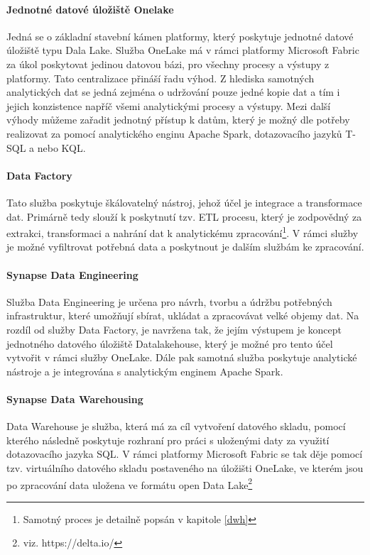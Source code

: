 \documentclass[
  digital,     %
  twoside,     %
  lof,         %
  lot,         %
]{fithesis4}
\begin{document}
\paragraph{Jednotné datové úložiště Onelake}
Jedná se o základní stavební kámen platformy, který poskytuje jednotné datové úložiště typu Dala Lake. Služba OneLake má v rámci platformy Microsoft Fabric za úkol poskytovat jedinou datovou bázi, pro všechny procesy a výstupy z platformy. Tato centralizace přináší řadu výhod. Z hlediska samotných analytických dat se jedná zejména o udržování pouze jedné kopie dat a tím i jejich konzistence napříč všemi analytickými procesy a výstupy. Mezi další výhody můžeme zařadit  jednotný přístup k datům, který je možný dle potřeby realizovat za pomocí analytického enginu Apache Spark, dotazovacího jazyků T-SQL a nebo KQL.\parencite{OneLake}

\paragraph{Data Factory}
Tato služba poskytuje škálovatelný nástroj, jehož účel je integrace a transformace dat. Primárně tedy slouží k poskytnutí tzv. ETL procesu, který je zodpovědný za extrakci, transformaci a nahrání dat k analytickému zpracování\footnote{Samotný proces je detailně  popsán v kapitole \ref{dwh}}. V rámci služby je možné vyfiltrovat potřebná data a poskytnout je dalším službám ke zpracování.\parencite{DataFactory}

\paragraph{Synapse Data Engineering}
Služba Data Engineering je určena pro návrh, tvorbu a údržbu potřebných infrastruktur, které umožňují sbírat, ukládat a zpracovávat velké objemy dat. Na rozdíl od služby Data Factory, je navržena tak, že jejím výstupem je koncept jednotného datového úložiště Datalakehouse, který je možné pro tento účel vytvořit v rámci služby OneLake. Dále pak samotná služba poskytuje analytické nástroje a je integrována s analytickým enginem Apache Spark.\parencite{DataEngineering}

\paragraph{Synapse Data Warehousing}
Data Warehouse je služba, která má za cíl vytvoření datového skladu, pomocí kterého následně poskytuje rozhraní pro práci s uloženými daty za využití dotazovacího jazyka SQL. V rámci platformy Microsoft Fabric se tak děje pomocí tzv. virtuálního datového skladu postaveného na úložišti OneLake, ve kterém jsou po zpracování data uložena ve formátu open Data Lake\footnote{viz. https://delta.io/} \parencite{DataWarehousing}
\end{document}
